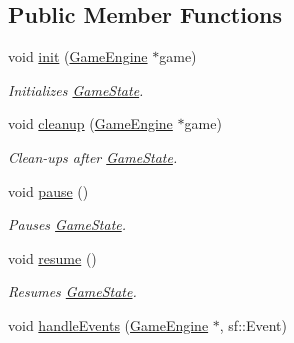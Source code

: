 \subsection*{Public Member Functions}
\begin{DoxyCompactItemize}
\item 
\mbox{\label{class_play_state_ae5761f09579d0f1800253764f2d68218}} 
void \mbox{\hyperlink{class_play_state_ae5761f09579d0f1800253764f2d68218}{init}} (\mbox{\hyperlink{class_game_engine}{Game\+Engine}} $\ast$game)
\begin{DoxyCompactList}\small\item\em Initializes \mbox{\hyperlink{class_game_state}{Game\+State}}. \end{DoxyCompactList}\item 
\mbox{\label{class_play_state_a047657388db62dc5a80b12147b0294b2}} 
void \mbox{\hyperlink{class_play_state_a047657388db62dc5a80b12147b0294b2}{cleanup}} (\mbox{\hyperlink{class_game_engine}{Game\+Engine}} $\ast$game)
\begin{DoxyCompactList}\small\item\em Clean-\/ups after \mbox{\hyperlink{class_game_state}{Game\+State}}. \end{DoxyCompactList}\item 
\mbox{\label{class_play_state_a5c135eed71fd8dbf30b75e577c28ad0d}} 
void \mbox{\hyperlink{class_play_state_a5c135eed71fd8dbf30b75e577c28ad0d}{pause}} ()
\begin{DoxyCompactList}\small\item\em Pauses \mbox{\hyperlink{class_game_state}{Game\+State}}. \end{DoxyCompactList}\item 
\mbox{\label{class_play_state_ad4dda6c0b72ce34bd9caaade8a5562b9}} 
void \mbox{\hyperlink{class_play_state_ad4dda6c0b72ce34bd9caaade8a5562b9}{resume}} ()
\begin{DoxyCompactList}\small\item\em Resumes \mbox{\hyperlink{class_game_state}{Game\+State}}. \end{DoxyCompactList}\item 
\mbox{\label{class_play_state_acdb47d9367dac45893eb9c9a45390385}} 
void \mbox{\hyperlink{class_play_state_acdb47d9367dac45893eb9c9a45390385}{handle\+Events}} (\mbox{\hyperlink{class_game_engine}{Game\+Engine}} $\ast$, sf\+::\+Event)

\end{DoxyCompactItemize}

